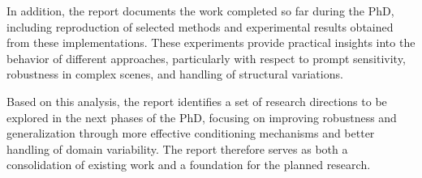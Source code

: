 \documentclass[journal,12pt,onecolumn,draftclsnofoot]{IEEEtran}
\newcounter{chapter}
\begin{document}
In addition, the report documents the work completed so far during the PhD, including reproduction of selected methods and experimental results obtained from these implementations. These experiments provide practical insights into the behavior of different approaches, particularly with respect to prompt sensitivity, robustness in complex scenes, and handling of structural variations.  

Based on this analysis, the report identifies a set of research directions to be explored in the next phases of the PhD, focusing on improving robustness and generalization through more effective conditioning mechanisms and better handling of domain variability. The report therefore serves as both a consolidation of existing work and a foundation for the planned research.

\newpage
\tableofcontents
\newpage

\cleardoublepage 
{} 
{}
\listoffigures
\vspace{2em}

\cleardoublepage
{}
{}
\listoftables
\vspace{2em}

\cleardoublepage
{}
{}
\end{document}
